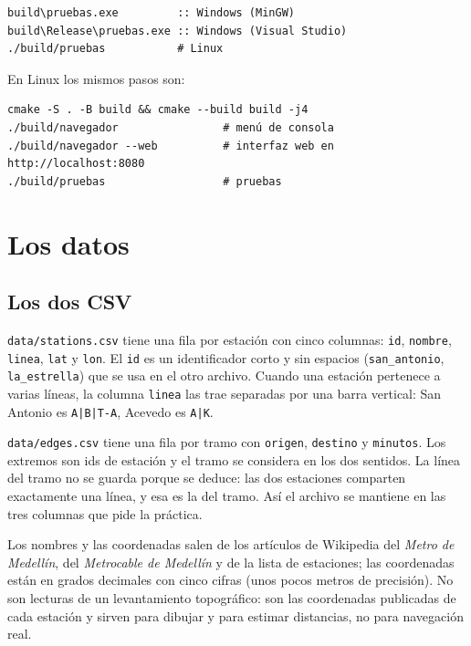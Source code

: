 \documentclass[11pt,a4paper]{article}
\newcommand{\arch}[1]{\texttt{#1}}
\begin{document}
\begin{lstlisting}[style=term]
build\pruebas.exe         :: Windows (MinGW)
build\Release\pruebas.exe :: Windows (Visual Studio)
./build/pruebas           # Linux
\end{lstlisting}

En Linux los mismos pasos son:

\begin{lstlisting}[style=term]
cmake -S . -B build && cmake --build build -j4
./build/navegador                # menú de consola
./build/navegador --web          # interfaz web en http://localhost:8080
./build/pruebas                  # pruebas
\end{lstlisting}

\section{Los datos}
\label{sec:datos}

\subsection{Los dos CSV}

\arch{data/stations.csv} tiene una fila por estación con cinco columnas:
\arch{id}, \arch{nombre}, \arch{linea}, \arch{lat} y \arch{lon}. El \arch{id} es
un identificador corto y sin espacios (\arch{san\_antonio}, \arch{la\_estrella})
que se usa en el otro archivo. Cuando una estación pertenece a varias líneas, la
columna \arch{linea} las trae separadas por una barra vertical: San Antonio es
\arch{A|B|T-A}, Acevedo es \arch{A|K}.

\arch{data/edges.csv} tiene una fila por tramo con \arch{origen},
\arch{destino} y \arch{minutos}. Los extremos son ids de estación y el tramo se
considera en los dos sentidos. La línea del tramo no se guarda porque se deduce:
las dos estaciones comparten exactamente una línea, y esa es la del tramo. Así el
archivo se mantiene en las tres columnas que pide la práctica.

Los nombres y las coordenadas salen de los artículos de Wikipedia del
\emph{Metro de Medellín}, del \emph{Metrocable de Medellín} y de la lista de
estaciones; las coordenadas están en grados decimales con cinco cifras (unos
pocos metros de precisión). No son lecturas de un levantamiento topográfico: son
las coordenadas publicadas de cada estación y sirven para dibujar y para estimar
distancias, no para navegación real.
\end{document}
